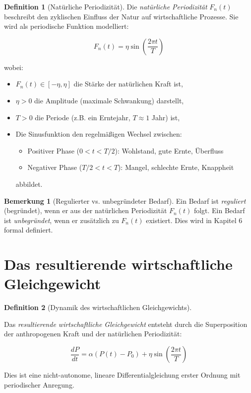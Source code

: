 \documentclass[a4paper,11pt]{report}
\theoremstyle{definition}
\newtheorem{definition}{Definition}[chapter]
\newtheorem{bemerkung}{Bemerkung}[chapter]
\begin{document}
\begin{definition}[Natürliche Periodizität]\label{def:periodizitaet}
    Die \emph{natürliche Periodizität} $F_n(t)$ beschreibt den zyklischen Einfluss der Natur auf wirtschaftliche Prozesse. Sie wird als periodische Funktion modelliert:
    
    \begin{equation}
        \boxed{F_n(t) = \eta \sin\left(\frac{2\pi t}{T}\right)}
        \label{eq:periodizitaet}
    \end{equation}
    
    wobei:
    \begin{itemize}
        \item $F_n(t) \in [-\eta, \eta]$ die Stärke der natürlichen Kraft ist,
        \item $\eta > 0$ die Amplitude (maximale Schwankung) darstellt,
        \item $T > 0$ die Periode (z.B. ein Erntejahr, $T \approx 1$ Jahr) ist,
        \item Die Sinusfunktion den regelmäßigen Wechsel zwischen:
        \begin{itemize}
            \item Positiver Phase ($0 < t < T/2$): Wohlstand, gute Ernte, Überfluss
            \item Negativer Phase ($T/2 < t < T$): Mangel, schlechte Ernte, Knappheit
        \end{itemize}
        abbildet.
    \end{itemize}
\end{definition}

\begin{bemerkung}[Regulierter vs. unbegründeter Bedarf]
    
    Ein Bedarf ist \emph{reguliert} (begründet), wenn er aus der natürlichen Periodizität $F_n(t)$ folgt. Ein Bedarf ist \emph{unbegründet}, wenn er zusätzlich zu $F_n(t)$ existiert. Dies wird in Kapitel 6 formal definiert.
\end{bemerkung}

\section{Das resultierende wirtschaftliche Gleichgewicht}

\begin{definition}[Dynamik des wirtschaftlichen Gleichgewichts]\label{def:gleichgewicht}
    
    Das \emph{resultierende wirtschaftliche Gleichgewicht} entsteht durch die Superposition der anthropogenen Kraft und der natürlichen Periodizität:
    
    \begin{equation}
        \boxed{\frac{dP}{dt} = \alpha(P(t) - P_0) + \eta \sin\left(\frac{2\pi t}{T}\right)}
        \label{eq:gleichgewicht_ode}
    \end{equation}
    
    Dies ist eine nicht-autonome, lineare Differentialgleichung erster Ordnung mit periodischer Anregung.
\end{definition}
\end{document}
